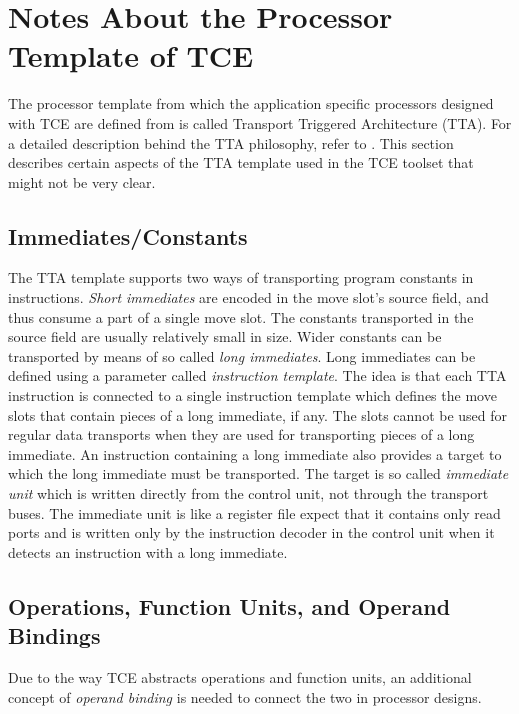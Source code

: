 \documentclass[twoside]{tceusermanual}
\begin{document}
\section{Notes About the Processor Template of TCE}
\label{section:template}

The processor template from which the application specific processors
designed with TCE are defined from is called Transport Triggered 
Architecture (TTA). For a detailed description behind the TTA philosophy, 
refer to \cite{HCorp97}.
This section describes certain aspects of the TTA template used in the TCE
toolset that might not be very clear.

\subsection{Immediates/Constants}

The TTA template supports two ways of transporting program constants in
instructions. \textit{Short immediates} are encoded in the move slot's
source field, and thus consume a part of a single move slot. The constants
transported in the source field are usually relatively small in size. 
Wider constants can be transported by means of so called \textit{long 
immediates}. Long immediates can be defined using a 
parameter called \textit{instruction template}. The idea is that
each TTA instruction is connected to a single instruction template which 
defines the move slots that contain pieces of a long immediate, if any. 
The slots cannot be used for
regular data transports when they are used for transporting pieces of
a long immediate. An instruction containing a long immediate also provides
a target to which the long immediate must be transported. The target is so 
called \textit{immediate unit} which is written directly from the control 
unit, not through the transport buses. The immediate unit is like
a register file expect that it contains only read ports and is written
only by the instruction decoder in the control unit when it detects an 
instruction with a long immediate.

\subsection{Operations, Function Units, and Operand Bindings}

Due to the way TCE abstracts operations and function units, an
additional concept of \textit{operand binding} is needed to 
connect the two in processor designs.
\end{document}
